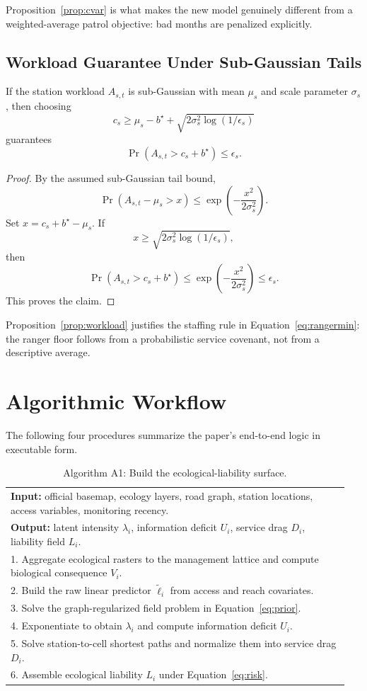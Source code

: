 Proposition~\ref{prop:cvar} is what makes the new model genuinely different from a weighted-average patrol objective: bad months are penalized explicitly.

\subsection{Workload Guarantee Under Sub-Gaussian Tails}
\begin{proposition}
\label{prop:workload}
If the station workload \(A_{s,t}\) is sub-Gaussian with mean \(\mu_s\) and scale parameter \(\sigma_s\), then choosing
\[
c_s
\ge
\mu_s-b^\star+\sqrt{2\sigma_s^2\log(1/\epsilon_s)}
\]
guarantees
\[
\Pr(A_{s,t}>c_s+b^\star)\le \epsilon_s.
\]
\end{proposition}
\begin{proof}
By the assumed sub-Gaussian tail bound,
\[
\Pr(A_{s,t}-\mu_s>x)\le \exp\!\left(-\frac{x^2}{2\sigma_s^2}\right).
\]
Set \(x=c_s+b^\star-\mu_s\). If
\[
x\ge \sqrt{2\sigma_s^2\log(1/\epsilon_s)},
\]
then
\[
\Pr(A_{s,t}>c_s+b^\star)
\le
\exp\!\left(-\frac{x^2}{2\sigma_s^2}\right)
\le
\epsilon_s.
\]
This proves the claim.
\end{proof}

Proposition~\ref{prop:workload} justifies the staffing rule in Equation~\eqref{eq:rangermin}: the ranger floor follows from a probabilistic service covenant, not from a descriptive average.

\section{Algorithmic Workflow}
The following four procedures summarize the paper's end-to-end logic in executable form.

\begin{table}[H]
\centering
\caption{Algorithm A1: Build the ecological-liability surface.}
\label{alg:app_transport}
\begin{tabular}{p{0.95\linewidth}}
\toprule
\textbf{Input:} official basemap, ecology layers, road graph, station locations, access variables, monitoring recency. \\
\textbf{Output:} latent intensity \(\lambda_i\), information deficit \(U_i\), service drag \(D_i\), liability field \(L_i\). \\
\midrule
1. Aggregate ecological rasters to the management lattice and compute biological consequence \(V_i\). \\
2. Build the raw linear predictor \(\widetilde \ell_i\) from access and reach covariates. \\
3. Solve the graph-regularized field problem in Equation~\eqref{eq:prior}. \\
4. Exponentiate to obtain \(\lambda_i\) and compute information deficit \(U_i\). \\
5. Solve station-to-cell shortest paths and normalize them into service drag \(D_i\). \\
6. Assemble ecological liability \(L_i\) under Equation~\eqref{eq:risk}. \\
\bottomrule
\end{tabular}
\end{table}

